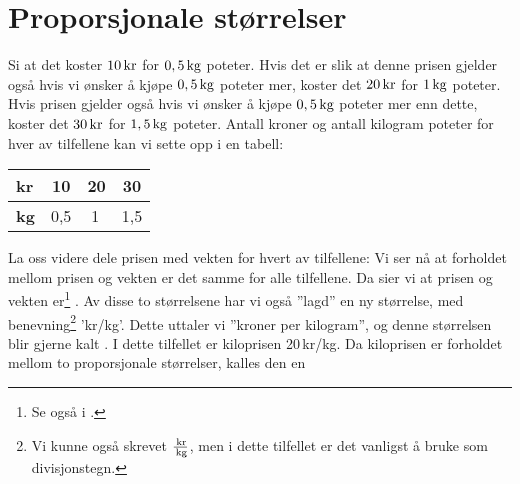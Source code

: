  \regv

\section{Proporsjonale størrelser \label{Propstorl}}
Si at det koster $ 10\,\textrm{kr}$ for $ 0,5\,\textrm{kg} $ poteter. Hvis det er slik at denne prisen gjelder også hvis vi ønsker å kjøpe $ 0,5\,\textrm{kg} $ poteter mer, koster det $ 20\,\textrm{kr} $ for $ 1\,\textrm{kg} $ poteter. Hvis prisen gjelder også hvis vi ønsker å kjøpe $ 0,5\,\textrm{kg} $ poteter mer enn dette, koster det $ 30\,\textrm{kr} $ for $ 1,5\,\textrm{kg} $ poteter. Antall kroner og antall kilogram poteter for hver av tilfellene kan vi sette opp i en tabell: \vs
\begin{center}
	\begin{tabular}{|l|c|c|c|}
		\hline
\textbf{kr} & 10  & 20 & 30 \\ \hline
\textbf{kg} & 0,5 & 1\,& 1,5 \\ \hline
	\end{tabular}
\end{center}
La oss videre dele prisen med vekten for hvert av tilfellene:
Vi ser nå at forholdet mellom prisen og vekten er det samme for alle tilfellene. Da sier vi at prisen og vekten er\footnote{Se også  i \mb.} . Av disse to størrelsene har vi også ''lagd'' en ny størrelse, med benevning\footnote{Vi kunne også skrevet $ \frac{\,\textrm{kr}}{\,\textrm{kg}} $, men i dette tilfellet er det vanligst å bruke \sym{/} som divisjonstegn.} 'kr/kg'. Dette uttaler vi ''kroner per kilogram'', og denne størrelsen blir gjerne kalt . I dette tilfellet er kiloprisen 20\,kr/kg. Da kiloprisen er forholdet mellom to proporsjonale størrelser, kalles den en  \regv
{} \regv

